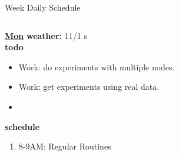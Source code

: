 \begin{columns}
\begin{column}{0.6\linewidth}
      \begin{block}{Week Daily Schedule}
        \begin{columns}
          \begin{column}{0.14\textwidth}{\small \underline{\bf Mon}}
            {\tiny \bf {\tiny weather:} } {\tiny 11/1 s} \\ 
            {\tiny \bf {\tiny todo}}\\ 
            \begin{itemize}
              \tiny \item \tiny Work: do experiments with multiple nodes. 
            \item \tiny Work: get experiments using real data.  
            \item \tiny 
            \end{itemize}
                {\small  \bf schedule}\\
                \begin{enumerate} 
                  \tiny \item \tiny 8-9AM: Regular Routines 
                \end{enumerate}
          \end{column}


\end{columns}
\end{block}
\end{column}
\end{columns}

